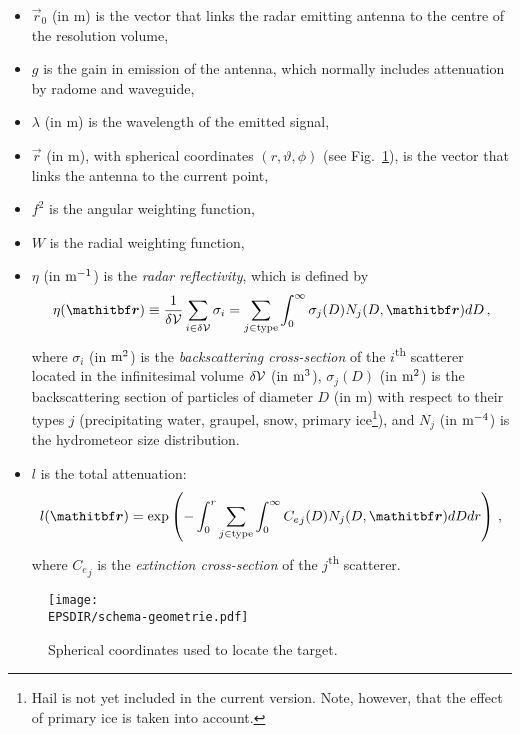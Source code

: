 \begin{itemize}
\item $\vec r_0$ (in m) is the vector that links the radar emitting antenna to the centre of the resolution volume, 
\item $g$ is the gain in emission of the antenna, which normally includes attenuation by radome and waveguide, 
\item $\lambda$ (in m) is the wavelength of the emitted signal, 
\item $\vec r$ (in m), with spherical coordinates $(r,\vartheta,\phi)$ (see Fig.~\ref{coord-spher}), is the vector that links the antenna to the current point, 
\item $f^2$ is the angular weighting function,
\item $W$ is the radial weighting function, 
\item $\eta$ (in $\rm m^{-1}$) is the \emph{radar reflectivity}, which is defined by
\begin{equation}
\eta(\vec r)\equiv\frac1{\delta\cal V}\sum_{i\in\delta\cal V}\sigma_i=\sum_{j\in\rm type}\int_0^\infty\sigma_j(D)N_j(D,\vec r)d D\,,\label{eta}
\end{equation}
where $\sigma_i$ (in $\rm m^2$) is the \emph{backscattering cross-section} of the $i$\textsuperscript{th} scatterer located in the infinitesimal volume $\delta\cal V$ (in $\rm m^3$), $\sigma_j(D)$ (in $\rm m^2$) is the backscattering section of particles of diameter $D$ (in m) with respect to their types $j$ (precipitating water, graupel, snow, primary ice\footnote{Hail is not yet included in the current version. Note, however, that the effect of primary ice is taken into account.}), and $N_j$ (in $\rm m^{-4}$) is the hydrometeor size distribution. %
\item $l$ is the total attenuation:
\begin{equation}
l({\vec r})=\exp\left(-\int_0^r\sum_{j\in\rm type}\int_0^\infty {C_e}_j(D)N_j(D,{\vec r})d Dd r\right)\,,\label{l}
\end{equation}
where ${C_e}_j$ is the \emph{extinction cross-section} of the $j$\textsuperscript{th} scatterer.
\end{itemize}

\begin{figure}
\centering
\texttt{[image: \\EPSDIR/schema-geometrie.pdf]}
\caption{Spherical coordinates used to locate the target.}\label{coord-spher}
\end{figure}

